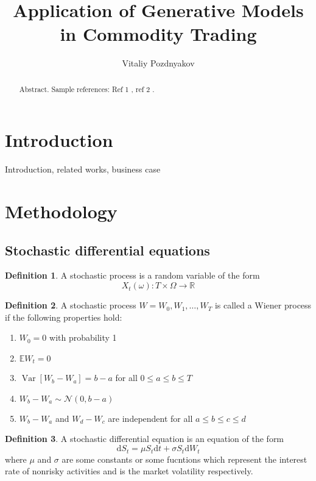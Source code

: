 \documentclass{article}
\title{Application of Generative Models \\ in Commodity Trading}
\author{Vitaliy Pozdnyakov}
\date{}
\theoremstyle{definition}
\newtheorem{definition}{Definition}[section]
\DeclareMathOperator{\Var}{Var}
\begin{document}
\maketitle

\begin{abstract}
    Abstract. Sample references: Ref 1 \cite{renscen}, ref 2 \citet{jebara}.
\end{abstract}

\section{Introduction}
Introduction, related works, business case

\section{Methodology}

\subsection{Stochastic differential equations}

\theoremstyle{definition}
\begin{definition}
    A stochastic process is a random variable of the form
    $$X_t(\omega): T \times \Omega \to \mathbb R$$
\end{definition}

\begin{definition}
    A stochastic process $W = W_0, W_1, \dots, W_T$ is called a Wiener process if the following properties hold:
    \begin{enumerate}
        \item $W_0 = 0$ with probability 1
        \item $\mathbb E W_t = 0$
        \item $\Var[W_b - W_a] = b - a$ for all $0\leq a \leq b \leq T$
        \item $W_b - W_a \sim \mathcal N (0, b-a)$
        \item $W_b - W_a$ and $W_d - W_c$ are independent for all $a \leq b \leq c \leq d$
    \end{enumerate}
\end{definition}

\begin{definition}
    A stochastic differential equation is an equation of the form
    $$\mathrm d S_t = \mu S_t \mathrm dt + \sigma S_t \mathrm d W_t$$
    where $\mu$ and $\sigma$ are some constants or some fucntions which represent the interest rate of nonrisky activities and is the market volatility respectively.
\end{definition}
\end{document}
